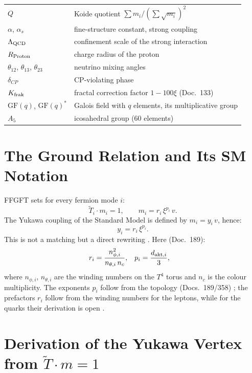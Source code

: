 \begin{tabular}{@{}lp{9cm}@{}}
$Q$ & Koide quotient $\sum m_i/(\sum\sqrt{m_i})^2$ \\
$\alpha$, $\alpha_s$ & fine-structure constant, strong coupling \\
$\Lambda_{\rm QCD}$ & confinement scale of the strong interaction \\
$R_{\rm Proton}$ & charge radius of the proton \\
$\theta_{12}$, $\theta_{13}$, $\theta_{23}$ & neutrino mixing angles \\
$\delta_{CP}$ & CP-violating phase \\
$K_{\rm frak}$ & fractal correction factor $1-100\xi$ (Doc.~133) \\
$\mathrm{GF}(q)$, $\mathrm{GF}(q)^*$ & Galois field with $q$ elements, its multiplicative group \\
$A_5$ & icosahedral group (60 elements) \\
\bottomrule
\end{tabular}

\section{The Ground Relation and Its SM Notation}

FFGFT sets for every fermion mode $i$:
\begin{equation}
  \tilde T_i \cdot m_i = 1, \qquad
  m_i = r_i\,\xi^{p_i}\,v.
  \label{eq:T0}
\end{equation}
The Yukawa coupling of the Standard Model is defined by $m_i = y_i\,v$,
hence:
\begin{equation}
  \boxed{y_i = r_i\,\xi^{p_i}.}
  \label{eq:yuk_ffgft}
\end{equation}
This is not a matching but a direct rewriting \BM. Here (Doc.~189):
\begin{align}
  r_i &= \frac{n_{\phi,i}^2}{n_{\theta,i}\,n_c},
  & p_i &= \frac{d_{{\rm akt},i}}{3},
\end{align}
where $n_{\phi,i}$, $n_{\theta,i}$ are the winding numbers on the $T^4$
torus and $n_c$ is the colour multiplicity. The exponents $p_i$ follow from
the topology (Docs.~189/358) \KM; the prefactors $r_i$ follow from the winding
numbers for the leptons, while for the quarks their derivation is open \SM.

\section{Derivation of the Yukawa Vertex from $\tilde T\cdot m = 1$}

